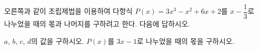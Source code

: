 오른쪽과 같이 조립제법을 이용하여 다항식 $P(x)=3x^3-x^2+6x+2$를 $x-\dfrac{1}{3}$로 나누었을 때의 몫과 나머지를 구하려고 한다. 다음에 답하시오.\par{}\par\smallskip\noindent
{} $a$, $b$, $c$, $d$의 값을 구하시오.
 $P(x)$를 $3x-1$로 나누었을 때의 몫을 구하시오.

